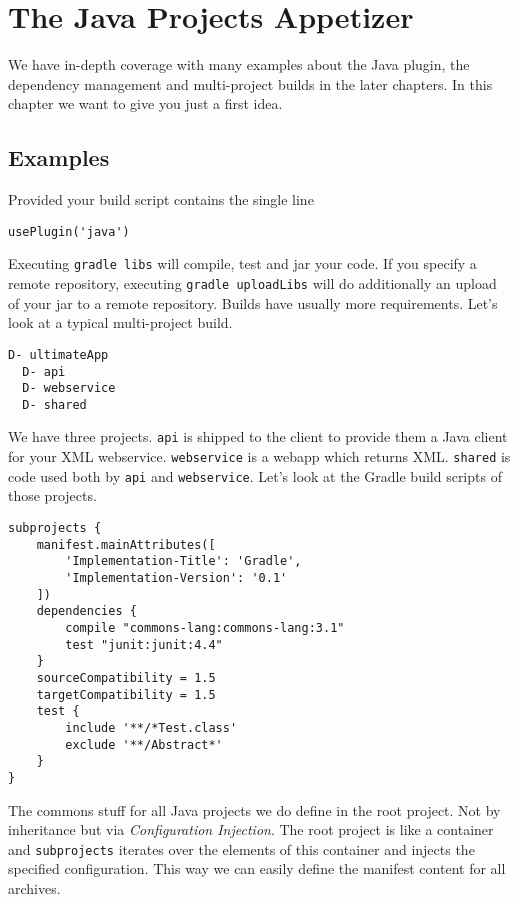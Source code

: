 \chapter{The Java Projects Appetizer} %
\label{cha:the_java_projects_tutorial}
We have in-depth coverage with many examples about the Java plugin, the dependency management and multi-project builds in the later chapters. In this chapter we want to give you just a first idea.

\section{Examples} %
\label{sec:examples}
Provided your build script contains the single line
\begin{Verbatim}
usePlugin('java')
\end{Verbatim}
Executing \texttt{gradle libs} will compile, test and jar your code. If you specify a remote repository, executing \texttt{gradle uploadLibs} will do additionally an upload of your jar to a remote repository. 
Builds have usually more requirements. Let's look at a typical multi-project build.

\begin{Verbatim}[frame=single,label=Project Tree]
D- ultimateApp
  D- api
  D- webservice
  D- shared 
\end{Verbatim}
We have three projects. \texttt{api} is shipped to the client to provide them a Java client for your XML webservice. \texttt{webservice} is a webapp which returns XML. \texttt{shared} is code used both by \texttt{api} and \texttt{webservice}. Let's look at the Gradle build scripts of those projects.

\begin{Verbatim}[frame=single,label=ultimateApp]
subprojects {
    manifest.mainAttributes([	       
	    'Implementation-Title': 'Gradle',
		'Implementation-Version': '0.1'
	])
	dependencies {
		compile "commons-lang:commons-lang:3.1"
		test "junit:junit:4.4"
	}
	sourceCompatibility = 1.5
	targetCompatibility = 1.5
	test {
	    include '**/*Test.class'
	    exclude '**/Abstract*'
	}
}
\end{Verbatim}
The commons stuff for all Java projects we do define in the root project. Not by inheritance but via \emph{Configuration Injection}. The root project is like a container and \texttt{subprojects} iterates over the elements of this container and injects the specified configuration. This way we can easily define the manifest content for all archives.

